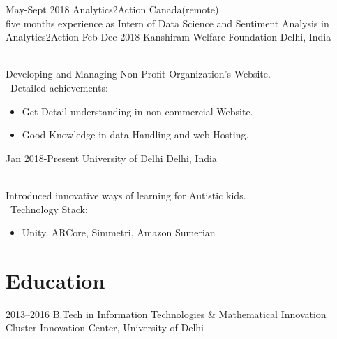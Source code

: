 \documentclass[]{cv-style}          %
\begin{document}
\begin{entrylist}
\entry
  {May-Sept 2018}
  {Analytics2Action}
  {Canada(remote)}
  {\\
  five months experience as Intern of Data Science  and Sentiment Analysis in Analytics2Action}
\entry
  {Feb-Dec 2018}
  {Kanshiram Welfare Foundation}
  {Delhi, India}
  {\\
  Developing and Managing Non Profit Organization's Website. \\\
  Detailed achievements:
  \begin{itemize}
    \item Get Detail understanding in non commercial Website.
     
     \item Good Knowledge in data Handling and web Hosting.
     
     
  \end{itemize}}
\entry
  {Jan 2018-Present}
  {University of Delhi}
  {Delhi, India}
  {\\
  Introduced innovative ways of learning for Autistic kids. \\\
  Technology Stack:
  \begin{itemize}
    \item  Unity, ARCore, Simmetri, Amazon Sumerian
     
     
  \end{itemize}}

\end{entrylist}


\section{Education}

\begin{entrylist}
\entry
{2013--2016}
{B.Tech {\normalfont in Information Technologies \& Mathematical Innovation}}
{Cluster Innovation Center, University of Delhi}


\end{entrylist}
\end{document}
